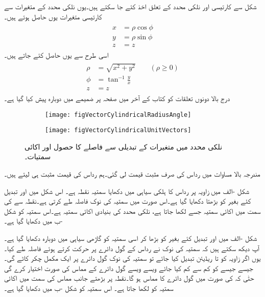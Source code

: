 شکل  سے کارتیسی اور نلکی محدد کے تعلق اخذ کئے جا سکتے ہیں۔یوں نلکی محدد کے متغیرات  سے کارتیسی متغیرات  یوں حاصل ہوتے ہیں۔
\begin{gather}
\begin{aligned}
x&=\rho \cos \phi\\
y&=\rho \sin \phi\\
z&=z
\end{aligned}
\end{gather}
اسی طرح  سے   یوں حاصل کئے جاتے ہیں۔
\begin{gather}
\begin{aligned}
\rho&=\sqrt{x^2+y^2} \quad \quad (\rho \ge 0)\\
\phi&=\tan^{-1} \frac{y}{x}\\
z&=z
\end{aligned}
\end{gather}
%
درج بالا دونوں تعلقات کو کتاب کے آخر میں صفحہ  پر ضمیمے میں دوبارہ پیش کیا گیا ہے۔
\begin{figure}
\centering
\begin{subfigure}{0.4\textwidth}
\centering
\texttt{[image: figVectorCylindricalRadiusAngle]}
\end{subfigure}%
%
\begin{subfigure}{0.4\textwidth}
\centering
\texttt{[image: figVectorCylindricalUnitVectors]}
\end{subfigure}%
\caption{نلکی محدد میں متغیرات کے تبدیلی سے فاصلے کا حصول اور اکائی سمتیات۔}
\label{شکل_سمتیہ_نلکی_تبدیلی_متغیرات}
\end{figure}
مندرجہ بالا مساوات میں رداس کی صرف مثبت قیمت لی گئی۔ہم  رداس کی قیمت مثبت ہی لیتے ہیں۔

شکل -الف میں  زاویہ پر  رداس کا ہلکی سیاہی میں دکھایا سمتیہ نقطہ  ہے۔
اس شکل میں  اور  تبدیل کئے بغیر  کو  بڑھتا دکھایا گیا ہے۔اس صورت میں سمتیہ کی نوک  فاصلہ طے کرتی ہے۔نقطہ  سے  کی سمت میں اکائی سمتیہ جسے  لکھا جاتا ہے، نلکی محدد کی  بنیادی اکائی سمتیہ ہے۔اس سمتیہ کو شکل -ب میں دکھایا گیا ہے۔

شکل -الف میں    اور  تبدیل کئے بغیر  کو  بڑھا کر اسی سمتیہ کو گاڑھی سیاہی میں دوبارہ دکھایا گیا ہے۔آپ دیکھ سکتے ہیں کہ  سمتیہ کی نوک نے  رداس کے گول دائرے پر حرکت کرتے ہوئے   فاصلہ طے کیا۔یوں اگر زاویہ کو  تا  ریڈیئن تبدیل کیا جائے  تو سمتیہ کی نوک گول دائرے پر ایک مکمل چکر کاٹے گی۔جیسے جیسے  کو کم سے کم کیا جائے ویسے ویسے    گول دائرے کے مماس کی صورت اختیار کرے گی حتٰی کہ  کی صورت میں  گول دائرے کا مماس ہو گا۔نقطہ  پر بڑھتے  جانب مماس کی سمت میں اکائی سمتیہ کو  لکھا جاتا ہے۔ اس سمتیہ کو شکل -ب میں دکھایا گیا ہے۔

